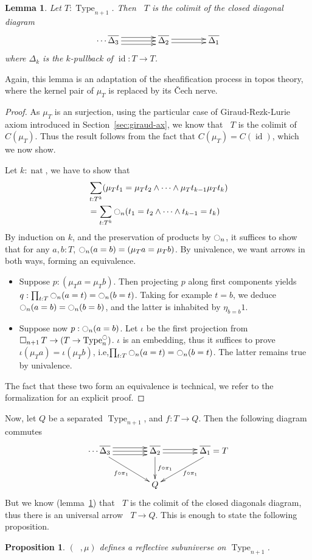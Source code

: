 \documentclass[conference]{IEEEtran}
\makeatletter
\newtheorem{prop}[thm]{Proposition}
\newtheorem{lem}[thm]{Lemma}
\newcommand{\ie}{i.e,\xspace}
\def\dar[#1]#2{\ar@<-#2>[#1]\ar@<#2>[#1]} %
\def\tar[#1]#2{\ar@<#2>[#1]\ar@<0pt>[#1]\ar@<-#2>[#1]} %
\DeclareMathOperator{\Type}{Type}
\DeclareMathOperator{\nat}{nat}
\DeclareMathOperator{\id}{id}
\newcommand{\modal}{\ensuremath{\ocircle}}
\newcommand \separated {\mathop{\square_{n+1}} }
\makeatother
\begin{document}
\begin{lem}\label{lem:sepiscolim}
  Let $T:\Type_{n+1}$. Then $\separated T$ is the colimit of the closed
  diagonal diagram
  $$\xymatrix @C=4em  { 
    \cdots \overline{\Delta_3} \tar[r]{4pt} & \overline{\Delta_2} \dar[r]{2pt} &
    \overline{\Delta_1}
  }$$
where $\Delta_k$ is the $k$-pullback of $\id : T \to T$.
\end{lem}

Again, this lemma is an adaptation of the sheafification process in
topos theory, where the kernel pair of $\mu_T$
is replaced by its \v{C}ech nerve.

\begin{proof}
  As $\mu_T$ is an surjection, using the particular case of 
  Giraud-Rezk-Lurie axiom introduced in Section~\ref{sec:giraud-ax},
  we know that $\separated T$ is the colimit of $C(\mu_T)$. 
%
  Thus the result follows from the fact that $C(\mu_T) = C(\id)$,
  which we now show.

  Let $k:\nat$, we have to show that 
  \begin{align*}
    &\sum_{t:T^k} (\mu_T t_1 = \mu_T t_2 \land \cdots
      \land \mu_T t_{k-1} \mu_T t_k)\\
    &= \sum_{t:T^k} \modal_n (t_1 = t_2 \land \cdots
      \land t_{k-1} = t_k)
  \end{align*}
By induction on $k$, and the preservation of products by $\modal_n$, it
suffices to show that for any $a,b:T$, $\modal_n (a=b) = (\mu_T a =
\mu_T b)$. By univalence, we want arrows in both ways, forming an
equivalence.
\begin{itemize}
\item Suppose $p : (\mu_T a = \mu_T b)$. Then projecting $p$ along
  first components yields $q : \prod_{t:T} \modal_n(a=t) = \modal_n (b=t)
  $.
  Taking for example $t=b$, we deduce $\modal_n (a=b) = \modal_n(b=b)$,
  and the latter is inhabited by $\eta_{b=b} 1$.
\item Suppose now $p : \modal_n(a=b)$. Let $\iota$ be the first
  projection from $\separated T \to (T \to \Type_n^\modal)$. $\iota$ is
  an embedding, thus it suffices to prove $\iota (\mu_T a) = \iota
  (\mu_T b)$, \ie $\prod_{t:T}\modal_n (a=t) = \modal_n (b=t)$. The latter
  remains true by univalence.
\end{itemize}
The fact that these two form an equivalence is technical, we refer to
the formalization for an explicit proof.
\end{proof}

Now, let $Q$ be a separated $\Type_{n+1}$, and $f:T \to Q$. Then the
following diagram commutes
$$\xymatrix @C=4em{ 
    \cdots \overline{\Delta_3} \tar[r]{4pt} \ar[rd]_{f\circ \pi_1} & \overline{\Delta_2}
    \dar[r]{2pt} \ar[d]^{f\circ \pi_1} &
    \overline{\Delta_1} = T \ar[ld]^{f\circ \pi_1}\\
    & Q &
  }$$
But we know (lemma~\ref{lem:sepiscolim}) that $\separated T$ is the
colimit of the closed diagonals diagram, thus there is an universal
arrow $\separated T \to Q$.
%
This is enough to state the following proposition.
\begin{prop}\label{prop:sep-subu}
  $(\separated,\mu)$ defines a reflective subuniverse on $\Type_{n+1}$.
\end{prop}
\end{document}
